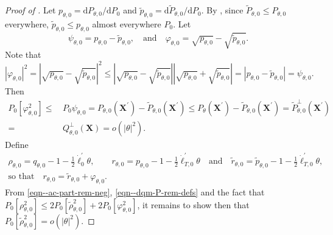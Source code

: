 \begin{proof}[Proof of ]
Let \(p_{\theta, 0} = \mathrm{d} P_{\theta, 0} / \mathrm{d} P_{0}\) and
\(\tilde{p}_{\theta, 0} = \mathrm{d} \tilde{P}_{\theta, 0} / \mathrm{d} P_{0}\).
By , since \(\tilde{P}_{\theta, 0} \leq
P_{\theta, 0}\) everywhere, \(\tilde{p}_{\theta, 0} \leq p_{\theta, 0}\) almost
everywhere \(P_{0}\).
Let
\begin{equation*}
  \psi_{\theta, 0} = p_{\theta, 0} - \tilde{p}_{\theta, 0},
  \quad \text{and} \quad
  \varphi_{\theta, 0} = \sqrt{p_{\theta, 0}} - \sqrt{\tilde{p}_{\theta, 0}}.
\end{equation*}
Note that
\begin{equation*}
    \left| \varphi_{\theta, 0} \right|^{2} = \left| \sqrt{p_{\theta, 0}} -
    \sqrt{\tilde{p}_{\theta, 0}} \right|^{2} \leq \left| \sqrt{p_{\theta, 0}} -
    \sqrt{\tilde{p}_{\theta, 0}} \right| \left| \sqrt{p_{\theta, 0}} +
    \sqrt{\tilde{p}_{\theta, 0}} \right| = \left| p_{\theta, 0} -
    \tilde{p}_{\theta, 0} \right| = \psi_{\theta, 0}.
\end{equation*}
Then
\begin{equation}
  \begin{split}
    P_{0} \left[ \varphi_{\theta, 0}^{2} \right] \leq
    & \,
    P_{0} \psi_{\theta, 0} =
    P_{\theta, 0} \left( \mathbf{X}^{\prime} \right) -
    \tilde{P}_{\theta, 0} \left( \mathbf{X}^{\prime} \right) \leq P_{\theta}
    \left( \mathbf{X}^{\prime} \right) - \tilde{P}_{\theta, 0} \left(
    \mathbf{X}^{\prime} \right) = \tilde{P}_{\theta, 0}^{\perp} \left(
    \mathbf{X}^{\prime} \right) \\
    =
    & \, Q_{\theta, 0}^{\perp} (\mathbf{X})
    = o \left( |\theta|^{2} \right).
  \end{split}
  \label{eqn--ac-part-rem-neg}
\end{equation}
Define
\begin{equation}
  \begin{gathered}
    \rho_{\theta, 0} = q_{\theta, 0} - 1 - \frac{1}{2} \dot{\ell}_{0}^{\prime}
    \theta, \qquad r_{\theta, 0} = p_{\theta, 0} - 1 - \frac{1}{2}
    \dot{\ell}_{T, 0}^{\prime} \theta \quad \text{and} \quad \tilde{r}_{\theta,
    0} = \tilde{p}_{\theta, 0} - 1 - \frac{1}{2} \dot{\ell}_{T, 0}^{\prime}
    \theta, \\
    \text{so that} \quad r_{\theta, 0} = \tilde{r}_{\theta, 0} +
    \varphi_{\theta, 0}.
  \end{gathered}
  \label{eqn--dqm-P-rem-defs}
\end{equation}
From \eqref{eqn--ac-part-rem-neg}, \eqref{eqn--dqm-P-rem-defs} and the fact that
\(P_{0} \left[ \rho_{\theta, 0}^{2} \right] \leq 2 P_{0} \left[
\tilde{\rho}_{\theta, 0}^{2} \right] + 2 P_{0} \left[ \varphi_{\theta, 0}^{2}
\right]\), it remains to show then that \(P_{0} \left[
\tilde{\rho}_{\theta, 0}^{2} \right] = o \left( |\theta|^{2} \right)\).


\end{proof}
